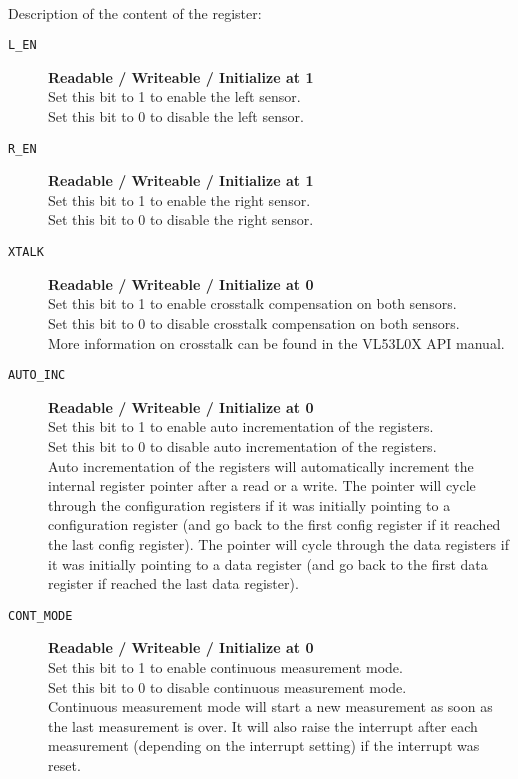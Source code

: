 \paragraph{} Description of the content of the register:
\begin{description}
 \item[\texttt{L\_EN}] \qquad \textbf{Readable / Writeable / Initialize at 1}\\
       Set this bit to 1 to enable the left sensor.\\
       Set this bit to 0 to disable the left sensor.

 \item[\texttt{R\_EN}] \qquad \textbf{Readable / Writeable / Initialize at 1}\\
       Set this bit to 1 to enable the right sensor.\\
       Set this bit to 0 to disable the right sensor.

 \item[\texttt{XTALK}] \qquad \textbf{Readable / Writeable / Initialize at 0}\\
       Set this bit to 1 to enable crosstalk compensation on both sensors.\\
       Set this bit to 0 to disable crosstalk compensation on both sensors.\\
       More information on crosstalk can be found in the VL53L0X API manual. \cite{tofAPI}

 \item[\texttt{AUTO\_INC}] \qquad \textbf{Readable / Writeable / Initialize at 0}\\
       Set this bit to 1 to enable \iic auto incrementation of the registers.\\
       Set this bit to 0 to disable \iic auto incrementation of the registers.\\
       Auto incrementation of the registers will automatically increment the internal register pointer after a read or a write. The pointer will cycle through the configuration registers if it was initially pointing to a configuration register (and go back to the first config register if it reached the last config register). The pointer will cycle through the data registers if it was initially pointing to a data register (and go back to the first data register if reached the last data register).

 \item[\texttt{CONT\_MODE}] \qquad \textbf{Readable / Writeable / Initialize at 0}\\
       Set this bit to 1 to enable continuous measurement mode.\\
       Set this bit to 0 to disable continuous measurement mode.\\
       Continuous measurement mode will start a new measurement as soon as the last measurement is over. It will also raise the interrupt after each measurement (depending on the interrupt setting) if the interrupt was reset.


\end{description}
